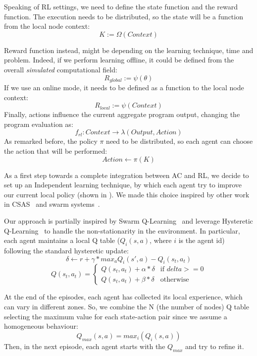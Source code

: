 \documentclass[conference]{IEEEtran}
\begin{document}
Speaking of RL settings, we need to define the state function and the reward function.
%
The execution needs to be distributed, so the state will be a function from the local node context:
$$
K := \Omega(\textit{Context})
$$

Reward function instead, might be depending on the learning technique, time and problem. 
 Indeed, if we perform learning offline, it could be defined from the overall \textit{simulated} computational field:
$$
\textit{R}_{global} := \psi({\theta})
$$
If we use an online mode, it needs to be defined as a function to the local node context:
$$
\textit{R}_{local} := \psi(\textit{Context})
$$
Finally, actions influence the current aggregate program output, changing the program evaluation as:
$$
f_{rl} : \textit{Context} \rightarrow \lambda(\textit{Output}, \textit{Action})
$$
As remarked before, the policy $\pi$ need to be distributed, so each agent can choose the action that will be performed:
$$
\textit{Action} \leftarrow \pi(K)
$$

As a first step towards a complete integration between AC and RL, we decide to set up an Independent learning technique, 
 by which each agent try to improve our current local policy (shown in ). 
% 
We made this choice inspired by other work in CSAS~\cite{csas-and-marl} and swarm systems~\cite{nguyen2018swarm}.

Our approach is partially inspired by Swarm Q-Learning~\cite{nguyen2018swarm} and leverage Hysteretic Q-Learning~\cite{hysteretic-q} to 
 handle the non-stationarity in the environment.
%
In particular, each agent maintains a local Q table ($Q_i(s, a)$, where $i$ is the agent id) following the standard hysteretic update:
$$
\delta \leftarrow r + \gamma * max_a Q_i(s', a) - Q_i(s_t, a_t)
$$
$$
Q(s_t, a_t) =  \begin{cases} 
  Q(s_t, a_t) + \alpha * \delta & \mbox{if } delta >= 0 \\ 
  Q(s_t, a_t) + \beta * \delta & \mbox{otherwise }
\end{cases}
$$

At the end of the episodes, each agent has collected its local experience, which can vary in different zones. So, 
 we combine the N (the number of nodes) Q table selecting the maximum value for each state-action pair since we assume a homogeneous behaviour:
$$
Q_{max}(s, a) = max_i(Q_i(s, a))
$$
Then, in the next episode, each agent starts with the $Q_{max}$ and try to refine it.
\end{document}
